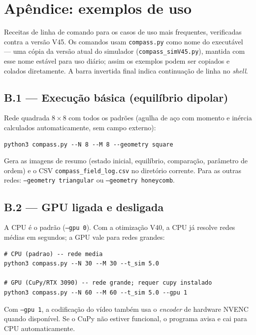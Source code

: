 \documentclass[11pt,a4paper]{article}
\newcommand{\code}[1]{\texttt{#1}}
\begin{document}
\section{Apêndice: exemplos de uso}
\label{app:exemplos}

Receitas de linha de comando para os casos de uso mais frequentes,
verificadas contra a versão V45. Os comandos usam \code{compass.py}
como nome do executável --- uma cópia da versão atual do simulador
(\code{compass\_simV45.py}), mantida com esse nome estável para uso
diário; assim os exemplos podem ser copiados e colados diretamente. A
barra invertida final
indica continuação de linha no \emph{shell}.

\subsection*{B.1 --- Execução básica (equilíbrio dipolar)}

Rede quadrada $8\times8$ com todos os padrões (agulha de aço com
momento e inércia calculados automaticamente, sem campo externo):
\begin{verbatim}
python3 compass.py --N 8 --M 8 --geometry square
\end{verbatim}
Gera as imagens de resumo (estado inicial, equilíbrio, comparação,
parâmetro de ordem) e o CSV \code{compass\_field\_log.csv} no diretório
corrente. Para as outras redes: \code{--geometry triangular} ou
\code{--geometry honeycomb}.

\subsection*{B.2 --- GPU ligada e desligada}

A CPU é o padrão (\code{--gpu 0}). Com a otimização V40, a CPU já
resolve redes médias em segundos; a GPU vale para redes grandes:
\begin{verbatim}
# CPU (padrao) -- rede media
python3 compass.py --N 30 --M 30 --t_sim 5.0

# GPU (CuPy/RTX 3090) -- rede grande; requer cupy instalado
python3 compass.py --N 60 --M 60 --t_sim 5.0 --gpu 1
\end{verbatim}
Com \code{--gpu 1}, a codificação do vídeo também usa o
\emph{encoder} de hardware NVENC quando disponível. Se o CuPy não
estiver funcional, o programa avisa e cai para CPU automaticamente.
\end{document}

